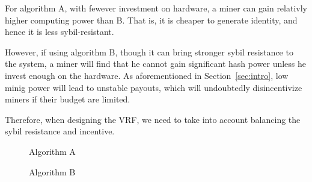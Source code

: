 For algorithm A, with fewever investment on hardware, a miner can gain relativly higher computing power than B. That is, it is cheaper to generate identity, and hence it is less sybil-resistant.

However, if using algorithm B, though it can bring stronger sybil resistance to the system, a miner will find that he cannot gain significant hash power unless he invest enough on the hardware.
As aforementioned in Section~\ref{sec:intro}, low minig power will lead to unstable payouts, which will undoubtedly disincentivize miners if their budget are limited.

Therefore, when designing the VRF, we need to take into account balancing the sybil resistance and incentive.

\begin{figure}
\centering
{}
\caption{Algorithm A}
\label{fig:algo_A}
\end{figure}


\begin{figure}
\centering
{}
\caption{Algorithm B}
\label{fig:algo_B}
\end{figure}
